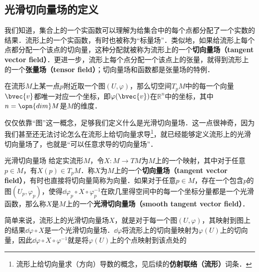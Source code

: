 
\subsection{光滑切向量场的定义}

我们知道，集合上的一个实函数可以理解为给集合中的每个点都分配了一个实数的结果．流形上的一个实函数，有时也被称为“标量场”．类似地，如果给流形上每个点都分配一个该点的切向量，这种分配就被称为流形上的一个\textbf{切向量场（tangent vector field）}．更进一步，流形上每个点分配一个该点上的张量，就得到流形上的一个\textbf{张量场（tensor field）}；切向量场和函数都是张量场的特例．


在流形$M$上某一点$p$附近取一个图$(U, \varphi)$，那么切空间$T_pM$中的每一个向量$\bvec{v}$都唯一对应一个坐标，即$\varphi(\bvec{v})$在$\mathbb{R}^n$中的坐标，其中$n=\opn{dim}M$是$M$的维度．

仅仅依靠“图”这一概念，足够我们定义什么是光滑切向量场．这一点很神奇，因为我们甚至还无法讨论怎么在流形上给切向量求导\footnote{流形上给切向量求（方向）导数的概念，见后续的\textbf{仿射联络（流形）}词条．}，就已经能够定义流形上的光滑切向量场了，也就是“可以任意求导的切向量场”．

\begin{definition}{光滑切向量场}
给定实流形$M$，令$X:M\to TM$为$M$上的一个映射，其中对于任意$p\in M$，有$X(p)\in T_pM$．称$X$为$M$上的一个\textbf{切向量场（tangent vector field）}，有时也直接将切向量简称为向量．如果对于任意$p\in M$，存在一个包含$p$的图$(U_p, \varphi_p)$，使得$\dd\varphi_p\circ X\circ\varphi_p^{-1}$在欧几里得空间中的每一个坐标分量都是一个光滑函数，那么称$X$是$M$上的一个\textbf{光滑切向量场（smooth tangent vector field）}．
\end{definition}

简单来说，流形上的光滑切向量场$X$，就是对于每一个图$(U, \varphi)$，其映射到图上的结果$\dd\varphi\circ X$是一个光滑切向量场．$\dd\varphi$将流形上的切向量映射为$\varphi(U)$上的切向量，因此$\dd\varphi\circ X\circ\varphi^{-1}$就是将$\varphi(U)$上的个点映射到该点处的





